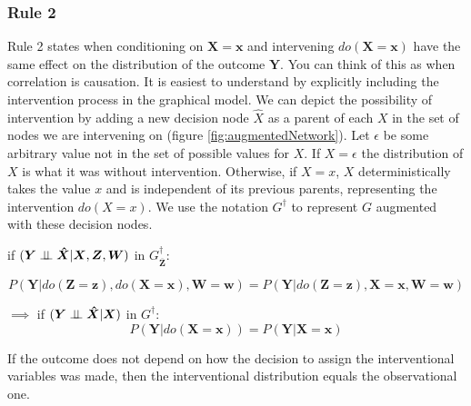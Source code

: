 \documentclass[11pt,a4paper]{article}
\begin{document}
\subsubsection{Rule 2}
Rule 2 states when conditioning on $\boldsymbol{X} = \boldsymbol{x}$ and intervening  $do(\boldsymbol{X}=\boldsymbol{x})$ have the same effect on the distribution of the outcome $\boldsymbol{Y}$. You can think of this as when correlation is causation. It is easiest to understand by explicitly including the intervention process in the graphical model. We can depict the possibility of intervention by adding a new decision node $\hat{X}$ as a parent of each $X$ in the set of nodes we are intervening on (figure \ref{fig:augmentedNetwork}). Let $\epsilon$ be some arbitrary value not in the set of possible values for $X$. If $X = \epsilon$ the distribution of $X$ is what it was without intervention. Otherwise, if $X=x$, $X$ deterministically takes the value $x$ and is independent of its previous parents, representing the intervention $do(X=x)$. We use the notation $G^{\dagger}$ to represent $G$ augmented with these decision nodes. 

if $(\boldsymbol{Y} \perp\!\!\!\perp \boldsymbol{\hat{X}}|\boldsymbol{X},\boldsymbol{Z},\boldsymbol{W})$ in $G^{\dagger}_{\boldsymbol{\overline{Z}}}$:

\begin{equation}
\label{eq:Do2}
P(\boldsymbol{Y}|do(\boldsymbol{Z}=\boldsymbol{z}),do(\boldsymbol{X}=\boldsymbol{x}),\boldsymbol{W}=\boldsymbol{w}) = P(\boldsymbol{Y}|do(\boldsymbol{Z}=\boldsymbol{z}),\boldsymbol{X}=\boldsymbol{x},\boldsymbol{W}=\boldsymbol{w})
\end{equation}

$\implies$ if  $(\boldsymbol{Y} \perp\!\!\!\perp \boldsymbol{\hat{X}}|\boldsymbol{X})$ in $G^{\dagger}$:
\begin{equation}
\label{eq:Do22}
P(\boldsymbol{Y}|do(\boldsymbol{X}=\boldsymbol{x})) = P(\boldsymbol{Y}|\boldsymbol{X}=\boldsymbol{x})
\end{equation}

If the outcome does not depend on how the decision to assign the interventional variables was made, then the interventional distribution equals the observational one. 
\end{document}
